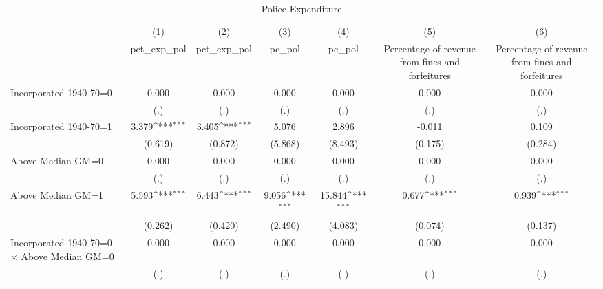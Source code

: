 \begin{table}[htbp]\centering
\def\sym#1{\ifmmode^{#1}\else\(^{#1}\)\fi}
\caption{Police Expenditure}
\begin{tabular}{l*{6}{c}}
\hline\hline
                    &\multicolumn{1}{c}{(1)}&\multicolumn{1}{c}{(2)}&\multicolumn{1}{c}{(3)}&\multicolumn{1}{c}{(4)}&\multicolumn{1}{c}{(5)}&\multicolumn{1}{c}{(6)}\\
                    &\multicolumn{1}{c}{pct\_exp\_pol}&\multicolumn{1}{c}{pct\_exp\_pol}&\multicolumn{1}{c}{pc\_pol}&\multicolumn{1}{c}{pc\_pol}&\multicolumn{1}{c}{Percentage of revenue from fines and forfeitures}&\multicolumn{1}{c}{Percentage of revenue from fines and forfeitures}\\
\hline
Incorporated 1940-70=0&       0.000         &       0.000         &       0.000         &       0.000         &       0.000         &       0.000         \\
                    &         (.)         &         (.)         &         (.)         &         (.)         &         (.)         &         (.)         \\
[1em]
Incorporated 1940-70=1&       3.379\sym{***}&       3.405\sym{***}&       5.076         &       2.896         &      -0.011         &       0.109         \\
                    &     (0.619)         &     (0.872)         &     (5.868)         &     (8.493)         &     (0.175)         &     (0.284)         \\
[1em]
Above Median GM=0   &       0.000         &       0.000         &       0.000         &       0.000         &       0.000         &       0.000         \\
                    &         (.)         &         (.)         &         (.)         &         (.)         &         (.)         &         (.)         \\
[1em]
Above Median GM=1   &       5.593\sym{***}&       6.443\sym{***}&       9.056\sym{***}&      15.844\sym{***}&       0.677\sym{***}&       0.939\sym{***}\\
                    &     (0.262)         &     (0.420)         &     (2.490)         &     (4.083)         &     (0.074)         &     (0.137)         \\
[1em]
Incorporated 1940-70=0 $\times$ Above Median GM=0&       0.000         &       0.000         &       0.000         &       0.000         &       0.000         &       0.000         \\
                    &         (.)         &         (.)         &         (.)         &         (.)         &         (.)         &         (.)         \\

\end{tabular}
\end{table}
